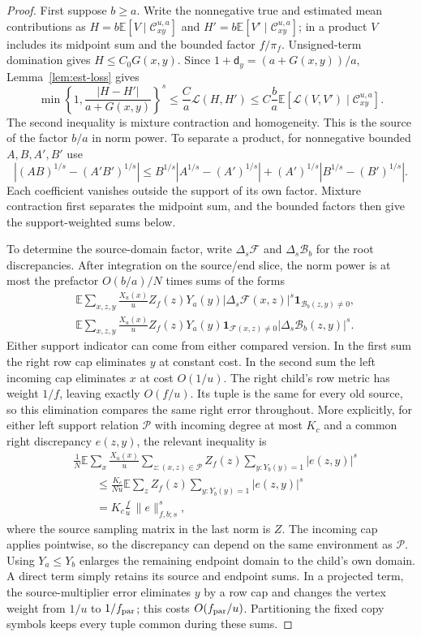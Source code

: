 \begin{proof}
First suppose $b\ge a$. Write the nonnegative true and estimated
mean contributions as $H=b\mathbb E[V\mid\mathcal C_{xy}^{u,a}]$
and $H'=b\mathbb E[V'\mid\mathcal C_{xy}^{u,a}]$; in a product
$V$ includes its midpoint sum and the bounded factor $f/\pi_f$.
Unsigned-term domination gives $H\le C_0G(x,y)$. Since
$1+\mathsf{d}_y=(a+G(x,y))/a$, Lemma~\ref{lem:est-loss} gives
\[
 \min\left\{1,\frac{|H-H'|}{a+G(x,y)}\right\}^{s}
 \le\frac C a\mathcal L(H,H')
 \le C\frac ba\mathbb E[\mathcal L(V,V')
                    \mid\mathcal C_{xy}^{u,a}].
\]
The second inequality is mixture contraction and homogeneity.
This is the source of the factor $b/a$ in norm power.
To separate a product, for nonnegative bounded $A,B,A',B'$ use
\[
 |(AB)^{1/s}-(A'B')^{1/s}|
 \le B^{1/s}|A^{1/s}-(A')^{1/s}|
       +(A')^{1/s}|B^{1/s}-(B')^{1/s}|.
\]
Each coefficient vanishes outside the support of its own factor.
Mixture contraction first separates the midpoint sum, and the
bounded factors then give the support-weighted sums below.

To determine the source-domain factor, write
$\Delta_s\mathcal F$ and $\Delta_s\mathcal B_b$ for the root discrepancies.
After integration on the source/end slice, the norm power is at most
the prefactor $O(b/a)/N$ times sums of the forms
\begin{align*}
 &\mathbb E\sum_{x,z,y}\frac{X_u(x)}u Z_f(z)Y_a(y)
       |\Delta_s\mathcal F(x,z)|^s
       \mathbf1_{\mathcal B_b(z,y)\ne0},\\
 &\mathbb E\sum_{x,z,y}\frac{X_u(x)}u Z_f(z)Y_a(y)
       \mathbf1_{\mathcal F(x,z)\ne0}
       |\Delta_s\mathcal B_b(z,y)|^s.
\end{align*}
Either support indicator can come from either compared version.  In the
first sum the right row cap eliminates $y$ at constant cost.  In the
second sum the left incoming cap eliminates $x$ at cost $O(1/u)$.
The right child's row metric has weight $1/f$, leaving exactly $O(f/u)$.
Its tuple is the same for every old source, so this elimination compares
the same right error throughout.  More explicitly, for either left
support relation $\mathcal P$ with incoming degree at most $K_c$ and
a common right discrepancy $e(z,y)$, the relevant inequality is
\begin{align*}
 &\frac1N\mathbb E\sum_x\frac{X_u(x)}u
       \sum_{z:(x,z)\in\mathcal P}Z_f(z)
       \sum_{y:Y_b(y)=1}|e(z,y)|^s\\
 &\qquad\leq \frac{K_c}{Nu}\mathbb E\sum_z Z_f(z)
       \sum_{y:Y_b(y)=1}|e(z,y)|^s\\
 &\qquad=K_c\frac fu\,\|e\|_{f,b;s}^s,
\end{align*}
where the source sampling matrix in the last norm is $Z$.
The incoming cap applies pointwise, so the discrepancy can depend on
the same environment as $\mathcal P$.
Using $Y_a\le Y_b$ enlarges the remaining
endpoint domain to the child's own domain.  A direct term simply retains
its source and endpoint sums.  In a projected term, the source-multiplier
error eliminates $y$ by a row cap and changes the vertex weight from
$1/u$ to $1/f_{\rm par}$; this costs $O(f_{\rm par}/u)$.
Partitioning the fixed copy symbols keeps every tuple common during these
sums.


\end{proof}
